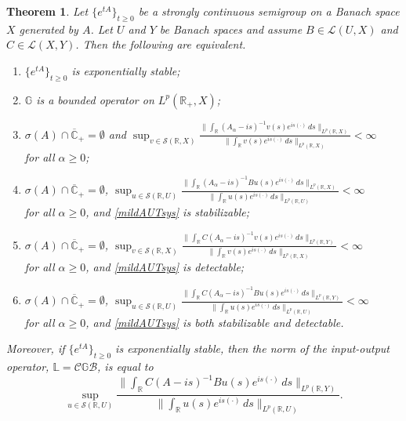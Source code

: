 \documentclass[10pt,psamsfonts,leqno]{siamltex}
\newtheorem{thm}[prop]{Theorem}
\newcommand{\bbR}{\mathbb{R}}
\newcommand{\bbL}{\mathbb{L}}
\newcommand{\bbG}{\mathbb{G}}
\newcommand{\calB}{\mathcal{B}}
\newcommand{\calC}{\mathcal{C}}
\newcommand{\calS}{\mathcal{S}}
\newcommand{\lb}{\label}
\newcommand{\LpRX}{{L^p(\bbR_+,X)}}
\begin{document}
\begin{thm}\lb{autonstab}
Let $\{e^{tA}\}_{t\ge 0}$ be a strongly continuous semigroup on
a Banach space $X$ generated by $A$. Let $U$ and $Y$ be Banach spaces
and assume $B\in\mathcal{L}(U,X)$ and $C\in\mathcal{L}(X,Y)$.  Then
the following are equivalent.
\begin{enumerate}
\item $\{e^{tA}\}_{t\ge 0} $ is exponentially stable;
\newline
\item $\bbG$ is a bounded operator on $\LpRX$;
\newline
\item $\sigma(A)\cap\overline{\mathbb C}_+=\emptyset$ and
$\displaystyle\sup_{v\in \calS(\bbR,X)}
\frac{\|\int_\bbR
  (A_\alpha-is)^{-1}v(s)e^{is(\cdot)}\,ds\|_{L^p(\bbR,X)}}
  {\|\int_\bbR v(s)e^{is(\cdot)}\,ds\|_{L^p(\bbR,X)}}<\infty$ \\for all
  $\alpha \ge 0$;
\newline
\item $\sigma(A)\cap\overline{\mathbb
C}_+=\emptyset$, $\displaystyle\sup_{u\in \calS(\bbR,U)}
\frac{\|\int_\bbR
  (A_\alpha-is)^{-1}Bu(s)e^{is(\cdot)}\,ds\|_{L^p(\bbR,X)}}
{\|\int_\bbR u(s)e^{is(\cdot)}\,ds\|_{L^p(\bbR,U)}}<\infty$
\\[5pt]
for all $\alpha \ge 0$, and  \eqref{mildAUTsys} is stabilizable;
\newline
\item $\sigma(A)\cap\overline{\mathbb C}_+=\emptyset$,
$\displaystyle\sup_{v\in \calS(\bbR,X)}
\frac{\|\int_\bbR
C(A_\alpha-is)^{-1}v(s)e^{is(\cdot)}\,ds\|_{L^p(\bbR,Y)}}
{\|\int_\bbR v(s)e^{is(\cdot)}\,ds\|_{L^p(\bbR,X)}}<\infty$
\\[5pt]
for all $\alpha \ge 0$,   and \eqref{mildAUTsys} is detectable;
\newline
\item $\sigma(A)\cap\overline{\mathbb
C}_+=\emptyset$, $\displaystyle\sup_{u\in \calS(\bbR,U)}
\frac{\|\int_\bbR
  C(A_\alpha-is)^{-1}Bu(s)e^{is(\cdot)}\,ds\|_{L^p(\bbR,Y)}}
{\|\int_\bbR u(s)e^{is(\cdot)}\,ds\|_{L^p(\bbR,U)}}<\infty$ \\[5pt]
for all $\alpha \ge 0$, and \eqref{mildAUTsys} is both stabilizable and
detectable.
\end{enumerate}
Moreover, if $\{e^{tA}\}_{t\ge0}$ is exponentially stable,
then the norm of the input-output operator,
$\bbL= \calC\bbG \calB $, is equal to
\[\sup_{u\in \calS(\bbR,U)}
\frac{\|\int_\bbR C (A-is)^{-1}B
u(s)e^{is(\cdot)}\,ds\|_{L^p(\bbR,Y)}}
{\|\int_\bbR u(s)e^{is(\cdot)}\,ds\|_{L^p(\bbR,U)}}.\]
\end{thm}
\end{document}
